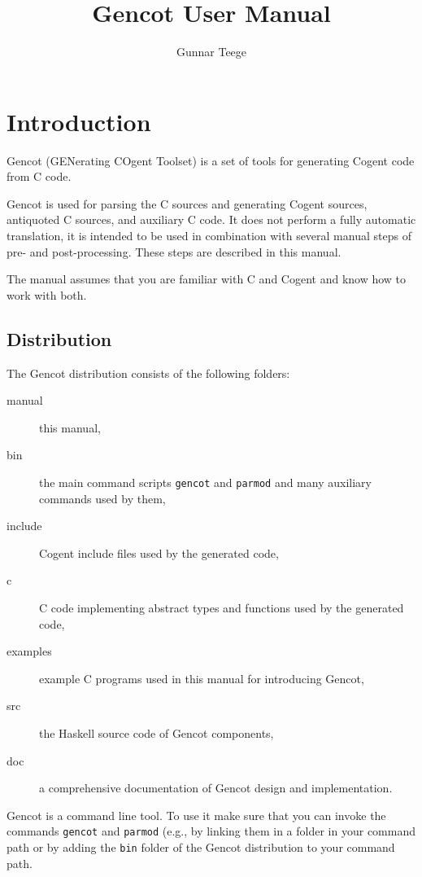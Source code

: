 \documentclass[a4paper]{report}
\newcommand{\code}[1]{\textnormal{\texttt{#1}}}
\begin{document}
\title{Gencot User Manual}
\author{Gunnar Teege}

\maketitle

\chapter{Introduction}

Gencot (GENerating COgent Toolset) is a set of tools for generating Cogent code from C code. 

Gencot is used for parsing the C sources and generating Cogent sources, 
antiquoted C sources, and auxiliary C code. It does not perform a fully automatic translation, it is
intended to be used in combination with several manual steps of pre- and post-processing. These
steps are described in this manual.

The manual assumes that you are familiar with C and Cogent and know how to work with both.

\section{Distribution}
\label{intro-dist}

The Gencot distribution consists of the following folders:
\begin{description}
\item[manual] this manual,
\item[bin] the main command scripts \code{gencot} and \code{parmod} and many auxiliary commands used by them,
\item[include] Cogent include files used by the generated code,
\item[c] C code implementing abstract types and functions used by the generated code,
\item[examples] example C programs used in this manual for introducing Gencot,
\item[src] the Haskell source code of Gencot components,
\item[doc] a comprehensive documentation of Gencot design and implementation.
\end{description}

Gencot is a command line tool. To use it make sure that you can invoke the commands \code{gencot} and
\code{parmod} (e.g., by linking them in a folder in your command path or by adding the \code{bin} folder
of the Gencot distribution to your command path.
\end{document}
